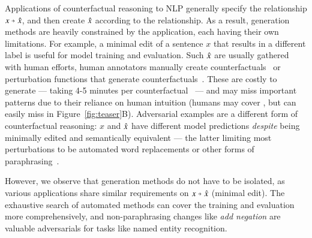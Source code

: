 Applications of counterfactual reasoning to NLP generally specify the relationship $x \veryshortarrow \xp$, and then create $\hat{x}$ according to the relationship.
As a result, generation methods are heavily constrained by the application, each having their own limitations.
For example, a minimal edit of a sentence $x$ that results in a different label is useful for model training and evaluation.
Such $\hat{x}$ are usually gathered with human efforts, \ie human annotators manually create counterfactuals~\cite{gardner2020contrast} or perturbation functions that generate counterfactuals~\cite{wu2019errudite}.
These are costly to generate --- taking 4-5 minutes per counterfactual~\cite{kaushik2019learning} --- and may miss important patterns due to their reliance on human intuition (\eg humans may cover , but can easily miss  in Figure~\ref{fig:teaser}B).
Adversarial examples are a different form of counterfactual reasoning: $x$ and $\hat{x}$ have different model predictions \emph{despite} being minimally edited and semantically equivalent --- the latter limiting most perturbations to be automated word replacements or other forms of paraphrasing~\cite{iyyer2018adversarial, ribeiro2018semantically}.

However, we observe that generation methods do not have to be isolated, as various applications share similar requirements on $x\veryshortarrow\xp$ (\eg minimal edit).
The exhaustive search of automated methods can cover the training and evaluation more comprehensively, and non-paraphrasing changes like \emph{add negation} are valuable adversarials for tasks like named entity recognition. 

